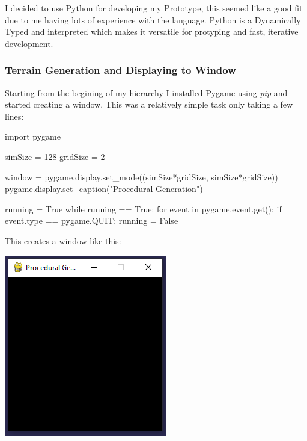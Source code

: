 \begin{flushleft}
            I decided to use Python for developing my Prototype, this seemed like a good fit due to me 
            having lots of experience with the language. Python is a Dynamically Typed and interpreted 
            which makes it versatile for protyping and fast, iterative development.
            \subsubsection{Terrain Generation and Displaying to Window}
            Starting from the begining of my hierarchy I installed Pygame using \textit{pip} and started creating a window.
            This was a relatively simple task only taking a few lines:
            \vspace{0.5cm}

            \normalsize
            \begin{pythoncode}
import pygame

simSize = 128
gridSize = 2

window = pygame.display.set_mode((simSize*gridSize, simSize*gridSize))
pygame.display.set_caption("Procedural Generation")

running = True
while running == True:
  for event in pygame.event.get():
    if event.type == pygame.QUIT:
      running = False
            \end{pythoncode}

            \vspace{0.5cm}

            \large
            This creates a window like this: \\ 
            \vspace{0.5cm}
            \centerline{\includegraphics{Images/Prototype/CreateWindowExample.PNG}}


\end{flushleft}
